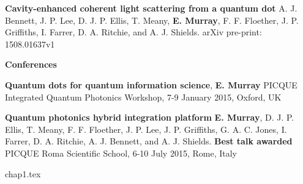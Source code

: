 \documentclass[12pt, oneside]{book}
\begin{document}
\small \textbf{Cavity-enhanced coherent light scattering from a quantum dot} A.
J. Bennett, J. P. Lee, D. J. P. Ellis, T. Meany, \textbf{E. Murray}, F. F.
Floether, J. P. Griffiths, I. Farrer, D. A. Ritchie, and A. J. Shields. \newline
arXiv pre-print: 1508.01637v1

\large\textbf{Conferences}

\small \textbf{Quantum dots for quantum information science}, \newline
\textbf{E. Murray} \newline PICQUE Integrated Quantum Photonics Workshop, 7-9
January 2015, Oxford, UK

\small \textbf{Quantum photonics hybrid integration platform} \newline
\textbf{E. Murray}, D. J. P. Ellis, T. Meany, F. F. Floether, J. P. Lee, J. P.
Griffiths, G. A. C. Jones, I. Farrer, D. A. Ritchie, A. J. Bennett, and A. J.
Shields. \newline \textbf{Best talk awarded} PICQUE Roma Scientific School, 6-10
July 2015, Rome, Italy

\newpage \tableofcontents

{chap1.tex}

 {}
\end{document}
